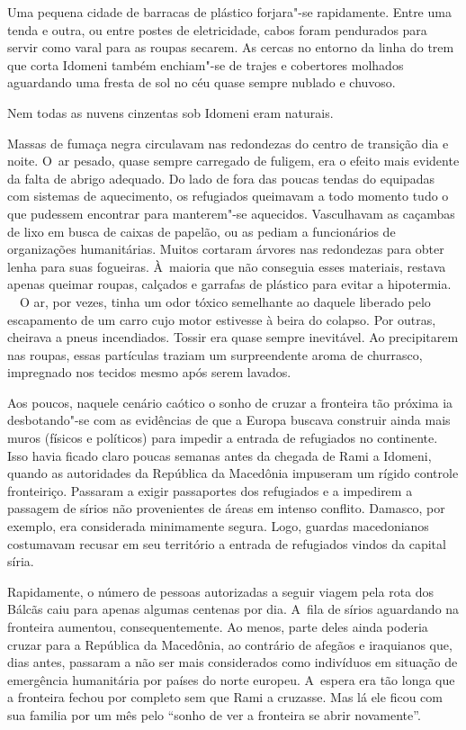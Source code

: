 Uma pequena cidade de barracas de plástico forjara"-se rapidamente. Entre
uma tenda e outra, ou entre postes de eletricidade, cabos foram
pendurados para servir como varal para as roupas secarem. As cercas no
entorno da linha do trem que corta Idomeni também enchiam"-se de trajes e
cobertores molhados aguardando uma fresta de sol no céu quase sempre
nublado e chuvoso.

Nem todas as nuvens cinzentas sob Idomeni eram naturais.

Massas de fumaça negra circulavam nas redondezas do centro de transição
dia e noite. O~ar pesado, quase sempre carregado de fuligem, era o
efeito mais evidente da falta de abrigo adequado. Do lado de fora das
poucas tendas do  equipadas com sistemas de aquecimento, os
refugiados queimavam a todo momento tudo o que pudessem encontrar para
manterem"-se aquecidos. Vasculhavam as caçambas de lixo em busca de
caixas de papelão, ou as pediam a funcionários de organizações
humanitárias. Muitos cortaram árvores nas redondezas para obter lenha
para suas fogueiras. À~maioria que não conseguia esses materiais,
restava apenas queimar roupas, calçados e garrafas de plástico para
evitar a hipotermia.
\ \
O ar, por vezes, tinha um odor tóxico semelhante ao daquele liberado
pelo escapamento de um carro cujo motor estivesse à beira do colapso.
Por outras, cheirava a pneus incendiados. Tossir era quase sempre
inevitável. Ao precipitarem nas roupas, essas partículas traziam um
surpreendente aroma de churrasco, impregnado nos tecidos mesmo após
serem lavados.

Aos poucos, naquele cenário caótico o sonho de cruzar a fronteira tão
próxima ia desbotando"-se com as evidências de que a Europa buscava
construir ainda mais muros (físicos e políticos) para impedir a entrada
de refugiados no continente. Isso havia ficado claro poucas semanas
antes da chegada de Rami a Idomeni, quando as autoridades da República
da Macedônia impuseram um rígido controle fronteiriço. Passaram a exigir
passaportes dos refugiados e a impedirem a passagem de sírios não
provenientes de áreas em intenso conflito. Damasco, por exemplo, era
considerada minimamente segura. Logo, guardas macedonianos costumavam
recusar em seu território a entrada de refugiados vindos da capital
síria.

Rapidamente, o número de pessoas autorizadas a seguir viagem pela rota
dos Bálcãs caiu para apenas algumas centenas por dia. A~fila de sírios
aguardando na fronteira aumentou, consequentemente. Ao menos, parte
deles ainda poderia cruzar para a República da Macedônia, ao contrário
de afegãos e iraquianos que, dias antes, passaram a não ser mais
considerados como indivíduos em situação de emergência humanitária por
países do norte europeu. A~espera era tão longa que a fronteira fechou
por completo sem que Rami a cruzasse. Mas lá ele ficou com sua familia
por um mês pelo ``sonho de ver a fronteira se abrir novamente''.

